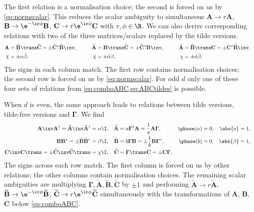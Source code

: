 \documentclass[11pt]{article}
\newcommand{\Gammab}{\boldsymbol{\Gamma}}
\newcommand{\A}{\mathbf{A}}
\newcommand{\B}{\mathbf{B}}
\renewcommand{\C}{\mathbf{C}}
\newcommand{\At}{\widetilde{\mathbf{A}}}
\newcommand{\Bt}{\widetilde{\mathbf{B}}}
\newcommand{\Ct}{\widetilde{\mathbf{C}}}
\begin{document}
%
The first relation is a normalisation choice; the second is forced on us by \cref{eq:normscalar}.
This reduces the scalar ambiguity to simultaneous \( \A \rightarrow r \A \), 
\( \B \rightarrow \e^{-\ir\phi} \B \), \( \C \rightarrow r\e^{\ir\phi} \C \) 
with \( r, \phi \in \R \).
We can also derive corresponding relations with two of the three matrices/scalars replaced by the tilde versions.
%
\begin{equation}\label{eq:ABCtildes}
\begin{aligned}
  \A &= \Bt\trans \Ct = \pm \Ct^\ast \Bt\inv, &\qquad
  \At &= \B\trans \Ct = \pm \Ct^\ast \B\inv, &\qquad
  \At &= \Bt\trans \C = \pm \C^\ast \Bt\inv, \\
  \tilde{\chi} &= \pm {\alpha} \tilde{\beta}, &
  \tilde{\chi} &= \pm \tilde{\alpha} {\beta}, &
  {\chi} &= \pm \tilde{\alpha} \tilde{\beta}.
\end{aligned}
\end{equation}
%
The signs in each column match.
The first row contains normalisation choices; the second row is forced on us by \cref{eq:normscalar}.
For odd $d$ only one of these four sets of relations from \cref{eq:comboABC,eq:ABCtildes} is possible.

When $d$ is even, the same approach leads to relations between tilde versions, tilde-free versions and $\Gammab$.
We find 
%
\begin{equation}\label{eq:chiraltilde}
\begin{aligned}
  \A\inv \A^\dag = \At\inv \At^\dag &= \alpha \I,    &
  \At &= a \Gammab^\dag \A = \frac{1}{a} \A \Gammab, &
  \phase(\alpha) &= 0, &
  \abs{a} &= 1, \\
  \B \B^\ast = \pm \Bt \Bt^\ast &= \beta \I, &
  \Bt &= b \Gammab \B = \pm \frac{1}{b} \B \Gammab^\ast,  &
  \phase(b) &= 0, &
  \abs{\beta} &= 1, \\
  \C\inv \C\trans = \pm \Ct\inv \Ct\trans &= \chi \I,    &
  \Ct &= \Gammab\trans \C = \pm \C \Gammab. &
\end{aligned}
\end{equation}
%
The signs across each row match.
The first column is forced on us by other relations; the other columns contain normalisation choices.
The remaining scalar ambiguities are multiplying $\Gammab,\At,\Bt,\Ct$ by $\pm1$
and performing \( \At \rightarrow r \At \), \( \Bt \rightarrow \e^{-\ir\phi} \Bt \),
\( \Ct \rightarrow r\e^{\ir\phi} \Ct \) simultaneously with the transformations of $\A$, $\B$, $\C$ below \cref{eq:comboABC}.
\end{document}
